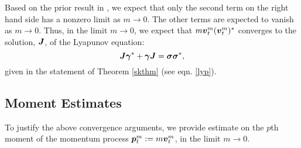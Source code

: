 Based on the prior result in \cite{hottovy2015smoluchowski}, we expect that only the second term on the right hand side has a nonzero limit as $m \to 0$. The other terms are expected to vanish as $m \to 0$. Thus, in the limit $m \to 0$, we expect that $m \boldsymbol{v}^m_{t} (\boldsymbol{v}^m_{t})^{*}$ converges to the solution, $\boldsymbol{J}$, of the Lyapunov equation:
\begin{equation}\boldsymbol{J} \boldsymbol{\gamma}^{*} + \boldsymbol{\gamma} \boldsymbol{J} = \boldsymbol{\sigma} \boldsymbol{\sigma}^{*}, \end{equation}
 given in the statement of Theorem \ref{skthm} (see eqn. \eqref{lyp}). 

\subsection{Moment Estimates}
To justify the above convergence arguments, we provide  estimate on the $p$th moment of the momentum process $\boldsymbol{p}^m_{t} := m\boldsymbol{v}^m_{t}$, in the limit $m \to 0$. 

